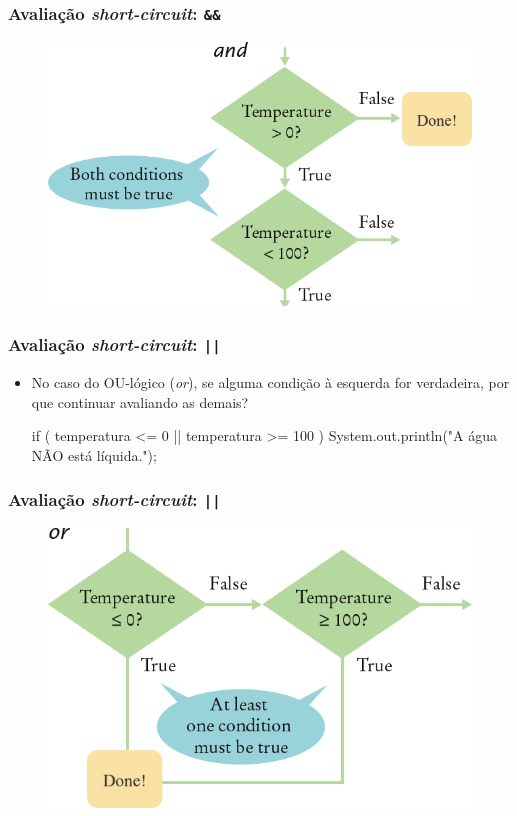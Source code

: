 \documentclass[xcolor={dvipsnames,table},aspectratio=169]{beamer}
\begin{document}
\begin{frame}\frametitle{Avaliação \emph{short-circuit}: \texttt{\&\&}}
\begin{figure}[h]
	\includegraphics[height=0.70\paperheight,center]{pucrs-ep-fprog-unidade_03-decisoes-laminas-short_and.png}
\end{figure}
\end{frame}

\begin{frame}[fragile]\frametitle{Avaliação \emph{short-circuit}: \texttt{||}}
\begin{itemize}
	\item No caso do OU-lógico (\emph{or}), se alguma condição à esquerda for verdadeira, por que continuar avaliando as demais?
\begin{javacode}
if ( temperatura <= 0 || temperatura >= 100 ) {
   System.out.println("A água NÃO está líquida."); 
}
\end{javacode}
\end{itemize}
\end{frame}

\begin{frame}\frametitle{Avaliação \emph{short-circuit}: \texttt{||}}
\begin{figure}[h]
	\includegraphics[height=0.70\paperheight,center]{pucrs-ep-fprog-unidade_03-decisoes-laminas-short_or.png}
\end{figure}
\end{frame}
\end{document}

